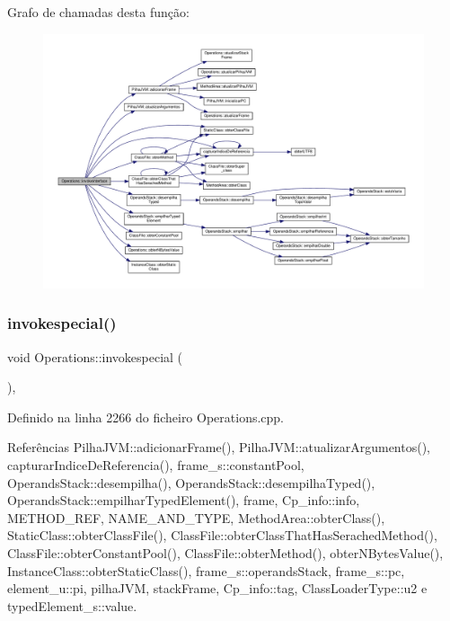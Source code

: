 Grafo de chamadas desta função\+:
\nopagebreak
\begin{figure}[H]
\begin{center}
\leavevmode
\includegraphics[width=350pt]{classOperations_a9206595fad5d3ac24514b2dfd6a013da_cgraph}
\end{center}
\end{figure}
\mbox{\label{classOperations_ab561e27c8450ceec7e4f8b0a155fcda3}} 
\subsubsection{\texorpdfstring{invokespecial()}{invokespecial()}}
{\footnotesize\ttfamily void Operations\+::invokespecial (\begin{DoxyParamCaption}{ }\end{DoxyParamCaption})\hspace{0.3cm}{\ttfamily [static]}, {\ttfamily [private]}}



Definido na linha 2266 do ficheiro Operations.\+cpp.



Referências Pilha\+J\+V\+M\+::adicionar\+Frame(), Pilha\+J\+V\+M\+::atualizar\+Argumentos(), capturar\+Indice\+De\+Referencia(), frame\+\_\+s\+::constant\+Pool, Operands\+Stack\+::desempilha(), Operands\+Stack\+::desempilha\+Typed(), Operands\+Stack\+::empilhar\+Typed\+Element(), frame, Cp\+\_\+info\+::info, M\+E\+T\+H\+O\+D\+\_\+\+R\+EF, N\+A\+M\+E\+\_\+\+A\+N\+D\+\_\+\+T\+Y\+PE, Method\+Area\+::obter\+Class(), Static\+Class\+::obter\+Class\+File(), Class\+File\+::obter\+Class\+That\+Has\+Serached\+Method(), Class\+File\+::obter\+Constant\+Pool(), Class\+File\+::obter\+Method(), obter\+N\+Bytes\+Value(), Instance\+Class\+::obter\+Static\+Class(), frame\+\_\+s\+::operands\+Stack, frame\+\_\+s\+::pc, element\+\_\+u\+::pi, pilha\+J\+VM, stack\+Frame, Cp\+\_\+info\+::tag, Class\+Loader\+Type\+::u2 e typed\+Element\+\_\+s\+::value.

